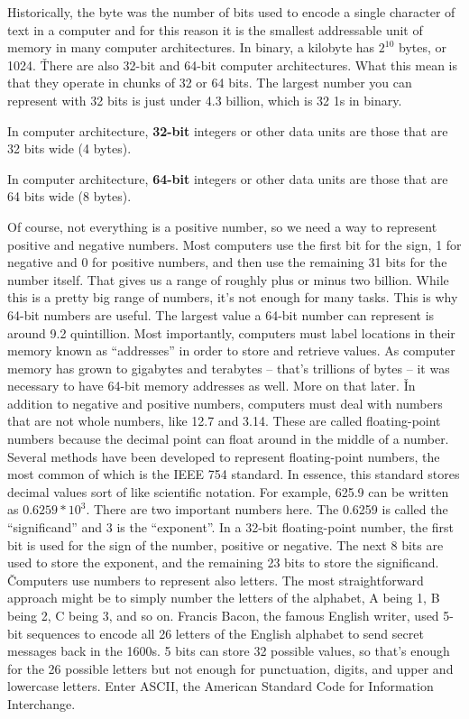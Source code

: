 Historically, the byte was the number of bits used to encode a single character of text in a computer and for this
reason it is the smallest addressable unit of memory in many computer architectures. In binary, a kilobyte has
$2^{10}$ bytes, or 1024. \v

There are also 32-bit and 64-bit computer architectures. What this mean is that they operate in chunks of 32 or 64
bits. The largest number you can represent with 32 bits is just under 4.3 billion, which is 32 1s in binary.

\bd[32-bit]
In computer architecture, \textbf{32-bit} integers or other data units are those that are 32 bits wide (4 bytes).
\ed

\bd[64-bit]
In computer architecture, \textbf{64-bit} integers or other data units are those that are 64 bits wide (8 bytes).
\ed

Of course, not everything is a positive number, so we need a way to represent positive and negative numbers. Most
computers use the first bit for the sign, 1 for negative and 0 for positive numbers, and then use the remaining 31
bits for the number itself. That gives us a range of roughly plus or minus two billion. While this is a pretty big
range of numbers, it's not enough for many tasks. This is why 64-bit numbers are useful. The largest value a 64-bit
number can represent is around 9.2 quintillion. Most importantly, computers must label locations in their memory
known as ``addresses'' in order to store and retrieve values. As computer memory has grown to gigabytes and terabytes
– that's trillions of bytes – it was necessary to have 64-bit memory addresses as well. More on that later. \v

In addition to negative and positive numbers, computers must deal with numbers that are not whole numbers, like 12.7
and 3.14. These are called floating-point numbers because the decimal point can float around in the middle of a
number. Several methods have been developed to represent floating-point numbers, the most common of which is the IEEE
754 standard. In essence, this standard stores decimal values sort of like scientific notation. For example, 625.9
can be written as $0.6259 * 10^3$. There are two important numbers here. The 0.6259 is called the ``significand'' and
3 is the ``exponent''. In a 32-bit floating-point number, the first bit is used for the sign of the number, positive
or negative. The next 8 bits are used to store the exponent, and the remaining 23 bits to store the significand. \v

Computers use numbers to represent also letters. The most straightforward approach might be to simply number the
letters of the alphabet, A being 1, B being 2, C being 3, and so on. Francis Bacon, the famous English writer, used
5-bit sequences to encode all 26 letters of the English alphabet to send secret messages back in the 1600s. 5 bits
can store 32 possible values, so that's enough for the 26 possible letters but not enough for punctuation, digits,
and upper and lowercase letters. Enter ASCII, the American Standard Code for Information Interchange.

